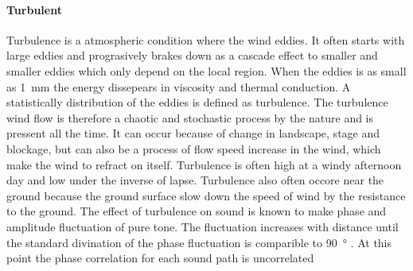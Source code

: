 \paragraph{Turbulent} Turbulence is a atmospheric condition where the wind eddies. It often starts with large eddies and prograsively brakes down as a cascade effect to smaller and smaller eddies which only depend on the local region. When the eddies is as small as \SI{1}{\milli\meter} the energy dissepears in viscosity and thermal conduction. A statistically distribution of the eddies is defined as turbulence. The turbulence wind flow is therefore a chaotic and stochastic process by the nature and is pressent all the time. It can occur because of change in landscape, stage and blockage, but can also be a process of flow speed increase in the wind, which make the wind to refract on itself. Turbulence is often high at a windy afternoon day and low under the inverse of lapse. Turbulence also often occore near the ground because the ground surface slow down the speed of wind by the resistance to the ground. The effect of turbulence on sound is known to make phase and amplitude fluctuation of pure tone. The fluctuation increases with distance until the standard divination of the phase fluctuation is comparible to \SI{90}{\degree} \citep{review_of_sound}. At this point the phase correlation for each sound path is uncorrelated









